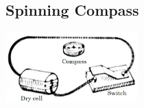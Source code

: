 \begin{multicols}{2}
%
%

\subsection{Spinning Compass} 

\begin{center}
\includegraphics[width=0.38\textwidth]{./img/spinning-compass.jpg}
\end{center}


\end{multicols}
